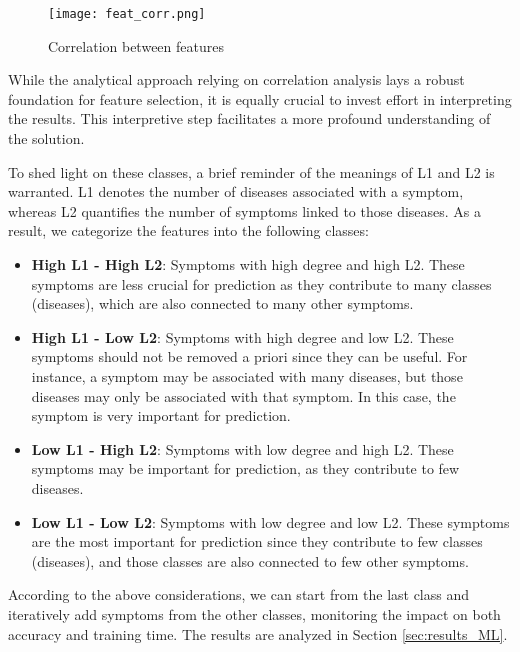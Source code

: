 \begin{figure*}[!t]
    \centering
    \texttt{[image: feat\_corr.png]}
    \caption{Correlation between features}
    \label{fig:feat_corr}
\end{figure*}

\noindent
While the analytical approach relying on correlation analysis lays a robust foundation for feature selection, 
it is equally crucial to invest effort in interpreting the results. This interpretive step facilitates a 
more profound understanding of the solution. 

To shed light on these classes, a brief reminder of the meanings of L1 and L2 is warranted. L1 denotes the number 
of diseases associated with a symptom, whereas L2 quantifies the number of symptoms linked to those diseases. 
As a result, we categorize the features into the following classes:\\

\begin{itemize}
    \setlength\itemsep{1em}
    \item \textbf{High L1 - High L2}: Symptoms with high degree and high L2. These symptoms are less crucial for
          prediction as they contribute to many classes (diseases), which are also connected to many other symptoms.
    \item \textbf{High L1 - Low L2}: Symptoms with high degree and low L2. These symptoms should not be removed a
          priori since they can be useful. For instance, a symptom may be associated with many diseases, but those
          diseases may only be associated with that symptom. In this case, the symptom is very important for prediction.
    \item \textbf{Low L1 - High L2}: Symptoms with low degree and high L2. These symptoms may be important for
          prediction, as they contribute to few diseases.
    \item \textbf{Low L1 - Low L2}: Symptoms with low degree and low L2. These symptoms are the most important
          for prediction since they contribute to few classes (diseases), and those classes are also connected to
          few other symptoms.
\end{itemize}
\vspace{0.4cm}

\noindent
According to the above considerations, we can start from the last class and iteratively add symptoms from the
other classes, monitoring the impact on both accuracy and training time.
The results are analyzed in Section \ref{sec:results_ML}.\\

